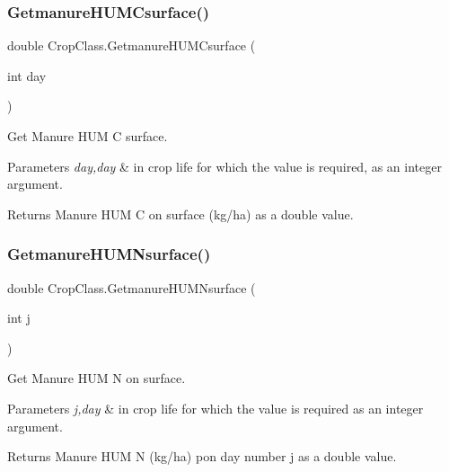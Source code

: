\subsubsection{\texorpdfstring{GetmanureHUMCsurface()}{GetmanureHUMCsurface()}}
{\footnotesize\ttfamily double Crop\+Class.\+Getmanure\+H\+U\+M\+Csurface (\begin{DoxyParamCaption}\item[{int}]{day }\end{DoxyParamCaption})\hspace{0.3cm}{\ttfamily [inline]}}



Get Manure H\+UM C surface. 


\begin{DoxyParams}{Parameters}
{\em day,day} & in crop life for which the value is required, as an integer argument. \\
\hline
\end{DoxyParams}
\begin{DoxyReturn}{Returns}
Manure H\+UM C on surface (kg/ha) as a double value. 
\end{DoxyReturn}
\mbox{\label{class_crop_class_a5fe271fc582346c1baf45adfa643db78}} 
\subsubsection{\texorpdfstring{GetmanureHUMNsurface()}{GetmanureHUMNsurface()}}
{\footnotesize\ttfamily double Crop\+Class.\+Getmanure\+H\+U\+M\+Nsurface (\begin{DoxyParamCaption}\item[{int}]{j }\end{DoxyParamCaption})\hspace{0.3cm}{\ttfamily [inline]}}



Get Manure H\+UM N on surface. 


\begin{DoxyParams}{Parameters}
{\em j,day} & in crop life for which the value is required as an integer argument. \\
\hline
\end{DoxyParams}
\begin{DoxyReturn}{Returns}
Manure H\+UM N (kg/ha) pon day number j as a double value. 
\end{DoxyReturn}
\mbox{\label{class_crop_class_aab815966a749158b0dd7bed57f67d1d7}} 
